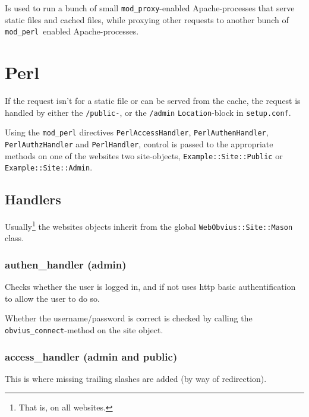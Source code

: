 \documentclass[a4paper,12pt]{article}
\newcommand{\modperl}{\texttt{mod\_perl}}
\newcommand{\modproxy}{\texttt{mod\_proxy}}
\begin{document}
Is used to run a bunch of small \modproxy-enabled Apache-processes
that serve static files and cached files, while proxying other
requests to another bunch of \modperl\ enabled Apache-processes.


\section{Perl}

If the request isn't for a static file or can be served from the
cache, the request is handled by either the \texttt{/public-}, or the
\texttt{/admin} \texttt{Location}-block in \texttt{setup.conf}.

Using the {\modperl} directives \texttt{PerlAccessHandler},
\texttt{PerlAuthenHandler}, \texttt{PerlAuthzHandler} and
\texttt{PerlHandler}, control is passed to the appropriate methods on
one of the websites two site-objects, \texttt{Example::Site::Public}
or \texttt{Example::Site::Admin}.


\subsection{Handlers}

Usually\footnote{That is, on all websites.} the websites objects
inherit from the global \texttt{WebObvius::Site::Mason} class.

\subsubsection{authen\_handler (admin)}

Checks whether the user is logged in, and if not uses http basic
authentification to allow the user to do so.

Whether the username/password is correct is checked by calling the
\texttt{obvius\_connect}-method on the site object.


\subsubsection{access\_handler (admin and public)}

This is where missing trailing slashes are added (by way of
redirection).
\end{document}
